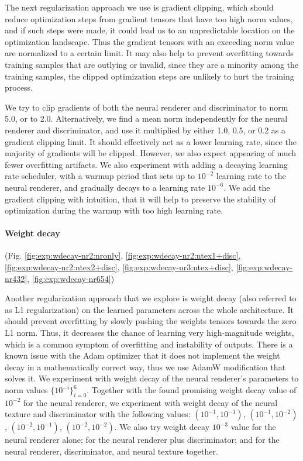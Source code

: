 The next regularization approach we use is gradient clipping, which should reduce optimization steps from gradient tensors that have too high norm values, and if such steps were made, it could lead us to an unpredictable location on the optimization landscape. Thus the gradient tensors with an exceeding norm value are normalized to a certain limit. It may also help to prevent overfitting towards training samples that are outlying or invalid, since they are a minority among the training samples, the clipped optimization steps are unlikely to hurt the training process.

We try to clip gradients of both the neural renderer and discriminator to norm 5.0, or to 2.0. Alternatively, we find a mean norm independently for the neural renderer and discriminator, and use it multiplied by either 1.0, 0.5, or 0.2 as a gradient clipping limit. It should effectively act as a lower learning rate, since the majority of gradients will be clipped. However, we also expect appearing of much fewer overfitting artifacts. We also experiment with adding a decaying learning rate scheduler, with a warmup period that sets up to $10^{-2}$ learning rate to the neural renderer, and gradually decays to a learning rate $10^{-6}$. We add the gradient clipping with intuition, that it will help to preserve the stability of optimization during the warmup with too high learning rate.

\vspace{-15pt}\paragraph{Weight decay}(Fig. \ref{fig:exp:wdecay-nr2:nronly}, \ref{fig:exp:wdecay-nr2:ntex1+disc}, \ref{fig:exp:wdecay-nr2:ntex2+disc}, \ref{fig:exp:wdecay-nr3:ntex+disc}, \ref{fig:exp:wdecay-nr432}, \ref{fig:exp:wdecay-nr654})\mbox{}\nopagebreak

Another regularization approach that we explore is weight decay (also referred to as L1 regularization) on the learned parameters across the whole architecture. It should prevent overfitting by slowly pushing the weights tensors towards the zero L1 norm. Thus, it decreases the chance of learning very high-magnitude weights, which is a common symptom of overfitting and instability of outputs. There is a known issue with the Adam optimizer that it does not implement the weight decay in a mathematically correct way, thus we use AdamW \cite{aux:adamw17} modification that solves it. We experiment with weight decay of the neural renderer's parameters to norm values $\{10^{-i}\}^{6}_{i=0}$. Together with the found promising weight decay value of $10^{-2}$ for the neural renderer, we experiment with weight decay of the neural texture and discriminator with the following values: $(10^{-1}, 10^{-1})$, $(10^{-1}, 10^{-2})$, $(10^{-2}, 10^{-1})$, $(10^{-2}, 10^{-2})$. We also try weight decay $10^{-3}$ value for the neural renderer alone; for the neural renderer plus discriminator; and for the neural renderer, discriminator, and neural texture together.

